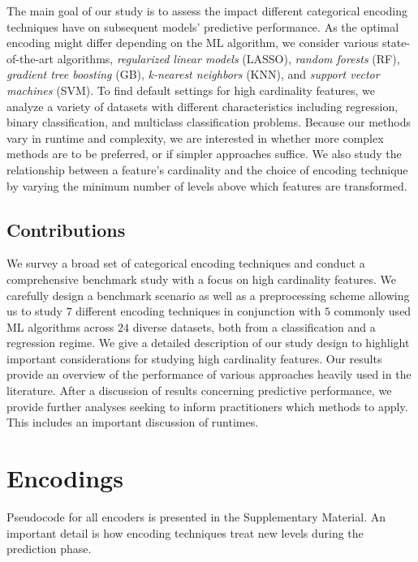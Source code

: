 \documentclass[smallextended]{svjour3}       %
\begin{document}
The main goal of our study is to assess the impact different categorical encoding techniques have on subsequent models' predictive performance.
As the optimal encoding might differ depending on the ML algorithm, we consider various state-of-the-art algorithms, \emph{regularized linear models} (LASSO), \emph{random forests} (RF), \emph{gradient tree boosting} (GB), \emph{k-nearest neighbors} (KNN), and \emph{support vector machines} (SVM).
To find default settings for high cardinality features, we analyze a variety of datasets with different characteristics including regression, binary classification, and multiclass classification problems.
Because our methods vary in runtime and complexity, we are interested in whether more complex methods are to be preferred, or if simpler approaches suffice.
We also study the relationship between a feature's cardinality and the choice of encoding technique by varying the minimum number of levels above which features are transformed.

\hypertarget{contributions}{%
\subsection{Contributions}\label{contributions}}

We survey a broad set of categorical encoding techniques and conduct a comprehensive benchmark study with a focus on high cardinality features.
We carefully design a benchmark scenario as well as a preprocessing scheme allowing us to study \(7\) different encoding techniques in conjunction with \(5\) commonly used ML algorithms across \(24\) diverse datasets, both from a classification and a regression regime.
We give a detailed description of our study design to highlight important considerations for studying high cardinality features.
Our results provide an overview of the performance of various approaches heavily used in the literature.
After a discussion of results concerning predictive performance, we provide further analyses seeking to inform practitioners which methods to apply.
This includes an important discussion of runtimes.

\hypertarget{encodings}{%
\section{Encodings}\label{encodings}}

\label{sec:methods}

Pseudocode for all encoders is presented in the Supplementary Material.
An important detail is how encoding techniques treat new levels during the prediction phase.
\end{document}
